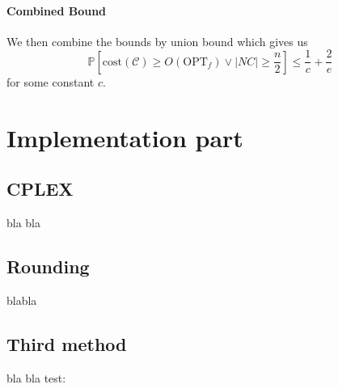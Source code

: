 \documentclass[11pt,a4paper,english]{article}
\newcommand{\PP}{\mathbb{P}}      %
\begin{document}
\paragraph{Combined Bound}
We then combine the bounds by union bound which gives us
$$\PP\left[\mathrm{cost}(\mathcal{C}) \geq O(\mathrm{OPT}_f) \vee  |NC| \geq \frac{n}{2} \right]
\leq \frac{1}{c} + \frac{2}{e}$$
for some constant $c$.

\clearpage


\section{Implementation part}

\subsection{CPLEX}
bla bla

\subsection{Rounding}
blabla

\subsection{Third method}
bla bla
test: \cite{Wolsey}

\clearpage


\end{document}
